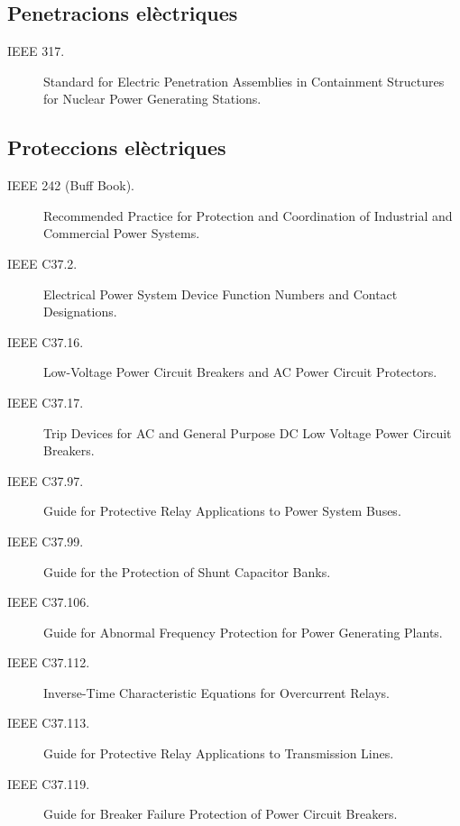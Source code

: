 \subsection*{Penetracions elèctriques}
\begin{description}
    \item [\hspace{5mm}IEEE 317.] Standard for Electric Penetration Assemblies in Containment Structures for Nuclear Power Generating Stations.
\end{description}


\subsection*{Proteccions elèctriques}
\begin{description}
    \item [\hspace{5mm}IEEE 242 (Buff Book).] Recommended Practice for Protection and Coordination of Industrial and Commercial Power Systems.
    \item [\hspace{5mm}IEEE C37.2.] Electrical Power System Device Function Numbers and Contact Designations.
    \item [\hspace{5mm}IEEE C37.16.] Low-Voltage Power Circuit Breakers and AC Power Circuit Protectors.
    \item [\hspace{5mm}IEEE C37.17.] Trip Devices for AC and General Purpose DC Low Voltage Power Circuit Breakers.
    \item [\hspace{5mm}IEEE C37.97.] Guide for Protective Relay Applications to Power System Buses.
    \item [\hspace{5mm}IEEE C37.99.] Guide for the Protection of Shunt Capacitor Banks.
    \item [\hspace{5mm}IEEE C37.106.] Guide for Abnormal Frequency Protection for Power Generating Plants.
    \item [\hspace{5mm}IEEE C37.112.] Inverse-Time Characteristic Equations for Overcurrent Relays.
    \item [\hspace{5mm}IEEE C37.113.] Guide for Protective Relay Applications to Transmission Lines.
    \item [\hspace{5mm}IEEE C37.119.] Guide for Breaker Failure Protection of Power Circuit Breakers.
\end{description}

